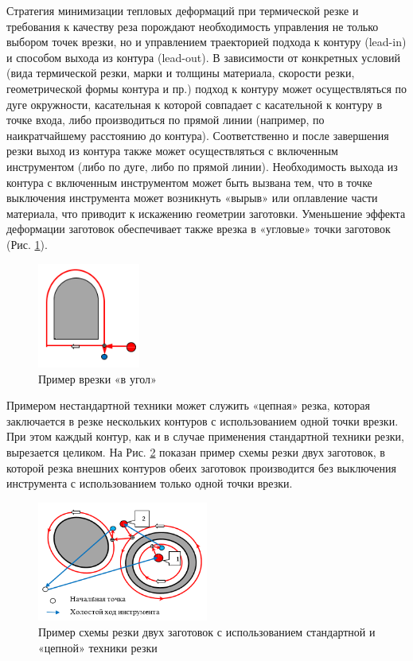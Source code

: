 \documentclass[12pt]{report}
\newcounter{cor}
\begin{document}
Стратегия минимизации тепловых деформаций при термической резке
и требования к качеству реза порождают необходимость управления
не только выбором точек врезки,
но и управлением траекторией подхода к контуру (lead-in)
и способом выхода из контура (lead-out).
В зависимости от конкретных условий
(вида термической резки, марки и толщины материала,
скорости резки, геометрической формы контура и пр.)
подход к контуру может осуществляться по дуге окружности,
касательная к которой совпадает с касательной к контуру в точке входа,
либо производиться по прямой линии
(например, по наикратчайшему расстоянию до контура).
Соответственно и после завершения резки выход из контура
также может осуществляться с включенным инструментом
(либо по дуге, либо по прямой линии).
Необходимость выхода из контура с включенным
инструментом может быть вызвана тем,
что в точке выключения инструмента может возникнуть
«вырыв» или оплавление части материала,
что приводит к искажению геометрии заготовки.
Уменьшение эффекта деформации заготовок обеспечивает
также врезка в «угловые» точки заготовок
(Рис. \ref{corner}).

\begin{figure}
  \begin{center}
  \includegraphics[width=0.3\textwidth]{corner.png}
  \caption{Пример врезки «в угол»}
  \label{corner}
  \end{center}
\end{figure}

Примером нестандартной техники
может служить «цепная» резка,
которая заключается в резке нескольких контуров с
использованием одной точки врезки.
При этом каждый контур,
как и в случае применения стандартной техники резки,
вырезается целиком.
На Рис. \ref{chain}
показан пример схемы резки двух заготовок,
в которой резка внешних контуров обеих заготовок
производится без выключения инструмента
с использованием только одной точки врезки.

\begin{figure}
  \begin{center}
  \includegraphics[width=0.5\textwidth]{chain.png}
  \caption{Пример схемы резки двух заготовок с использованием стандартной и «цепной» техники резки}
  \label{chain}
  \end{center}
\end{figure}
\end{document}

